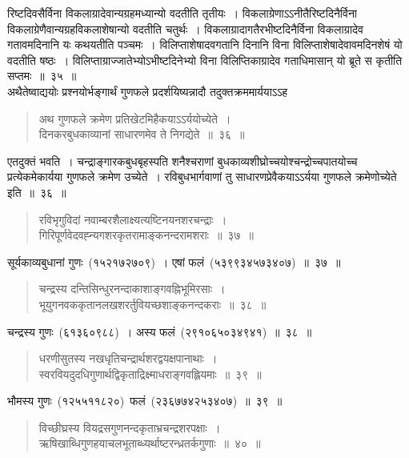 \documentclass[11pt, openany]{book}
\begin{document}
\newpage
\thispagestyle{fancy}
\fancyhf{}
\noindent
रिष्टदिवसैर्विना विकलाग्रादेवान्यग्रहमध्यान्यो वदतीति तृतीयः~। विकलाग्रेणाऽऽनीतैरिष्टदिनैर्विना विकलाग्रेणैवान्यग्रहविकलाशेषान्यो वदतीति चतुर्थः~।
विकलाग्रादागतैरभीष्टदिनैर्विना विकलाग्रादेव गतावमदिनानि यः कथयतीति
पञ्चमः~। विलिप्ताशेषादवगतानि दिनानि विना विलिप्ताशेषादेवावमदिनशेषं
यो वदतीति षष्ठः~। विलिप्ताग्राज्जातेभ्योऽभीष्टदिनेभ्यो विना विलिप्तिकाग्रादेव
गताधिमासान् यो ब्रूते स कृतीति सप्तमः~॥~३५~॥\\

\indent
अथैतेष्वाद्ययोः प्रश्नयोर्भङ्गार्थं गुणफले प्रदर्शयिष्यन्नादौ तदुक्तक्रममार्ययाऽऽह\textendash

\begin{quote}
{\ks अथ गुणफले क्रमेण प्रतिखेटमिहैकयाऽऽर्ययोच्येते~।\\
दिनकरबुधकाव्यानां साधारणमेव ते निगद्येते~॥~३६~॥}
\end{quote}

\indent
एतदुक्तं भवति~। चन्द्राङ्गारकबुधबृहस्पति शनैश्चराणां बुधकाव्यशीघ्रोच्चयोश्चन्द्रोच्चपातयोच्च प्रत्येकमेकार्यया गुणफले क्रमेण उच्येते~।
रविबुधभार्गवाणां तु साधारणप्रेवैकयाऽऽर्यया गुणफले क्रमेणोच्येते इति~॥~३६~॥

\begin{quote}
{\ks रविभृगुविदां नवाम्बरशैलाक्ष्यत्यष्टिनयनशरचन्द्राः~।\\
गिरिपूर्णवेदवह्न्यगशरकृतरामाङ्कनन्दरामशराः~॥~३७~॥}
\end{quote}

\indent
सूर्यकाव्यबुधानां गुणः~(१५२१७२७०९)~। एषां फलं~(५३९९३४५७३४०७)~॥~३७~॥

\begin{quote}
{\ks चन्द्रस्य दन्तिसिन्धुरनन्दाकाशाङ्गवह्निभूमिरसाः~।\\
भूयुगनवककृतानलखशरर्तुवियच्छशाङ्कनन्दकराः~॥~३८~॥}
\end{quote}

\indent
चन्द्रस्य गुणः~(६१३६०९८८)~। अस्य फलं~(२९१०६५०३४९४१)~॥~३८~॥

\begin{quote}
{\ks धरणीसुतस्य नखधृतिचन्द्रार्थशरद्वयक्षपानाथाः~।\\
स्वरवियदुदधिगुणार्थद्विकृताद्रिक्ष्माधराङ्गवह्लियमाः~॥~३९~॥}
\end{quote}

\indent
भौमस्य गुणः~(१२५५११८२०)~फलं~(२३६७७४२५३४०७)~॥~३९~॥

\begin{quote}
{\ks विच्छीघ्रस्य वियद्रसगुणनन्दकृताभ्रचन्द्रशरपक्षाः~।\\
ऋषिखाब्धिगुणहयाचलभूताब्ध्यर्थाष्टरन्ध्रतर्कगुणाः~॥~४०~॥}
\end{quote}
\end{document}
